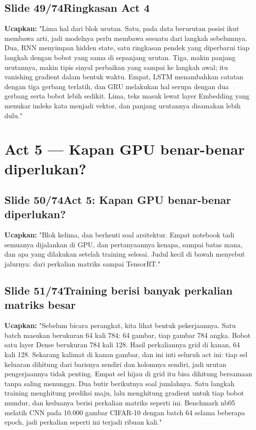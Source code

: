 \documentclass[11pt]{article}
\renewcommand{\framebox}[1]{\colorbox{acc!15}{\textcolor{acc}{\textbf{#1}}}}
\begin{document}
\subsection*{\framebox{Slide 49/74}\quad Ringkasan Act 4}
\textbf{Ucapkan:} "Lima hal dari blok urutan. Satu, pada data berurutan posisi ikut membawa arti, jadi modelnya perlu membawa sesuatu dari langkah sebelumnya. Dua, RNN menyimpan hidden state, satu ringkasan pendek yang diperbarui tiap langkah dengan bobot yang sama di sepanjang urutan. Tiga, makin panjang urutannya, makin tipis sinyal perbaikan yang sampai ke langkah awal; itu vanishing gradient dalam bentuk waktu. Empat, LSTM menambahkan catatan dengan tiga gerbang terlatih, dan GRU melakukan hal serupa dengan dua gerbang serta bobot lebih sedikit. Lima, teks masuk lewat layer Embedding yang menukar indeks kata menjadi vektor, dan panjang urutannya disamakan lebih dulu."\\[2pt]

\section{Act 5 — Kapan GPU benar-benar diperlukan?}

\subsection*{\framebox{Slide 50/74}\quad Act 5: Kapan GPU benar-benar diperlukan?}
\textbf{Ucapkan:} "Blok kelima, dan berhenti soal arsitektur. Empat notebook tadi semuanya dijalankan di GPU, dan pertanyaannya kenapa, sampai batas mana, dan apa yang dilakukan setelah training selesai. Judul kecil di bawah menyebut jalurnya: dari perkalian matriks sampai TensorRT."\\[2pt]

\subsection*{\framebox{Slide 51/74}\quad Training berisi banyak perkalian matriks besar}
\textbf{Ucapkan:} "Sebelum bicara perangkat, kita lihat bentuk pekerjaannya. Satu batch masukan berukuran 64 kali 784: 64 gambar, tiap gambar 784 angka. Bobot satu layer Dense berukuran 784 kali 128. Hasil perkaliannya grid di kanan, 64 kali 128. Sekarang kalimat di kanan gambar, dan ini inti seluruh act ini: tiap sel keluaran dihitung dari barisnya sendiri dan kolomnya sendiri, jadi urutan pengerjaannya tidak penting. Empat sel hijau di grid itu bisa dihitung bersamaan tanpa saling menunggu. Dua butir berikutnya soal jumlahnya. Satu langkah training menghitung prediksi maju, lalu menghitung gradient untuk tiap bobot mundur, dan keduanya berisi perkalian matriks seperti ini. Benchmark nb05 melatih CNN pada 10.000 gambar CIFAR-10 dengan batch 64 selama beberapa epoch, jadi perkalian seperti ini terjadi ribuan kali."\\[2pt]
\end{document}

